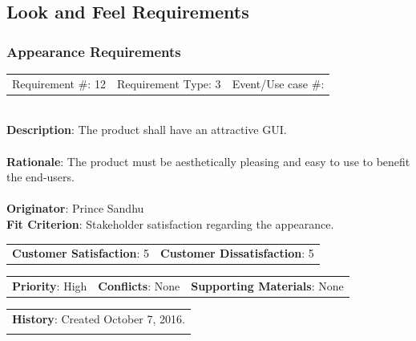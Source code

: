 \documentclass[12pt, titlepage]{article}
\begin{document}
\subsection{Look and Feel Requirements}

\subsubsection{Appearance Requirements}

\begin{reqbox}

\begin{tabular}{lll}
Requirement \#: 12 & Requirement Type: 3 & Event/Use case \#: \\
\end{tabular} \\

\textbf{Description}: The product shall have an attractive GUI. \\ \\
\textbf{Rationale}: The product must be aesthetically pleasing and easy to use to benefit the end-users. \\ \\
\textbf{Originator}: Prince Sandhu \\
\textbf{Fit Criterion}: Stakeholder satisfaction regarding the appearance. \\

\begin{tabular}{ll}
\textbf{Customer Satisfaction}: 5 & \textbf{Customer Dissatisfaction}: 5 \\
\end{tabular}

\begin{tabular}{lll}
\textbf{Priority}: High & \textbf{Conflicts}: None & \textbf{Supporting Materials}: None \\
\end{tabular}

\begin{tabular}{l}
\textbf{History}: Created October 7, 2016.\\ \\
\end{tabular}

\end{reqbox}
\end{document}
